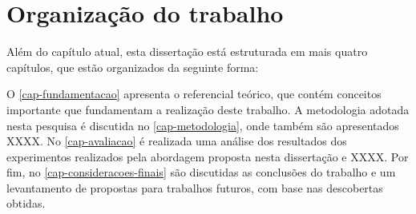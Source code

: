 \section{Organização do trabalho}
\label{sec:organizacao-trabalho}

Além do capítulo atual, esta dissertação está estruturada em mais quatro capítulos, que estão organizados da seguinte forma:

O \autoref{cap-fundamentacao} apresenta o referencial teórico, que contém conceitos importante que fundamentam a realização deste trabalho. 
A metodologia adotada nesta pesquisa é discutida no \autoref{cap-metodologia}, onde também são apresentados XXXX. %
No \autoref{cap-avaliacao} é realizada uma análise dos resultados dos experimentos realizados pela abordagem proposta nesta dissertação e XXXX. %
Por fim, no \autoref{cap-consideracoes-finais} são discutidas as conclusões do trabalho e um levantamento de propostas para trabalhos futuros, com base nas descobertas obtidas.


